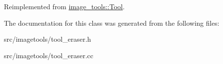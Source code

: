 Reimplemented from \hyperlink{classimage__tools_1_1Tool_a1b7cd7d59588923d7e29b6150334f5b8}{image\+\_\+tools\+::\+Tool}.



The documentation for this class was generated from the following files\+:\begin{DoxyCompactItemize}
\item 
src/imagetools/tool\+\_\+eraser.\+h\item 
src/imagetools/tool\+\_\+eraser.\+cc\end{DoxyCompactItemize}
